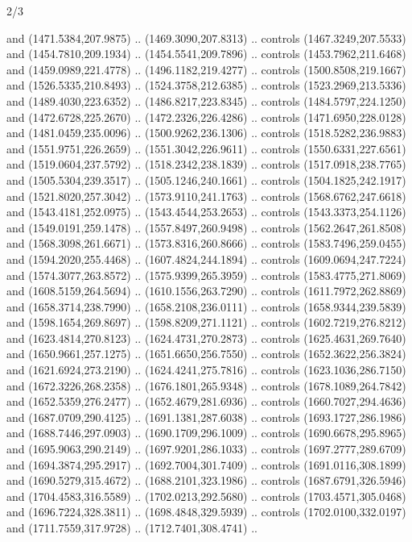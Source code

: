 \begin{flagdescription}{2/3}
\begin{scope}[shift=(c),scale=\flagwidth/391]
\begin{scope}[draw=black,fill=orange,line join=round,line cap=round,y=0.1mm, x=0.1mm,
 line width=0.001\flagwidth, yscale=-1,xscale=1,xshift=-172.5mm,yshift=-25mm]
  and (1471.5384,207.9875) .. (1469.3090,207.8313) .. controls
  (1467.3249,207.5533) and (1454.7810,209.1934) .. (1454.5541,209.7896) ..
  controls (1453.7962,211.6468) and (1459.0989,221.4778) .. (1496.1182,219.4277)
  .. controls (1500.8508,219.1667) and (1526.5335,210.8493) ..
  (1524.3758,212.6385) .. controls (1523.2969,213.5336) and (1489.4030,223.6352)
  .. (1486.8217,223.8345) .. controls (1484.5797,224.1250) and
  (1472.6728,225.2670) .. (1472.2326,226.4286) .. controls (1471.6950,228.0128)
  and (1481.0459,235.0096) .. (1500.9262,236.1306) .. controls
  (1518.5282,236.9883) and (1551.9751,226.2659) .. (1551.3042,226.9611) ..
  controls (1550.6331,227.6561) and (1519.0604,237.5792) .. (1518.2342,238.1839)
  .. controls (1517.0918,238.7765) and (1505.5304,239.3517) ..
  (1505.1246,240.1661) .. controls (1504.1825,242.1917) and (1521.8020,257.3042)
  .. (1573.9110,241.1763) .. controls (1568.6762,247.6618) and
  (1543.4181,252.0975) .. (1543.4544,253.2653) .. controls (1543.3373,254.1126)
  and (1549.0191,259.1478) .. (1557.8497,260.9498) .. controls
  (1562.2647,261.8508) and (1568.3098,261.6671) .. (1573.8316,260.8666) ..
  controls (1583.7496,259.0455) and (1594.2020,255.4468) .. (1607.4824,244.1894)
  .. controls (1609.0694,247.7224) and (1574.3077,263.8572) ..
  (1575.9399,265.3959) .. controls (1583.4775,271.8069) and (1608.5159,264.5694)
  .. (1610.1556,263.7290) .. controls (1611.7972,262.8869) and
  (1658.3714,238.7990) .. (1658.2108,236.0111) .. controls (1658.9344,239.5839)
  and (1598.1654,269.8697) .. (1598.8209,271.1121) .. controls
  (1602.7219,276.8212) and (1623.4814,270.8123) .. (1624.4731,270.2873) ..
  controls (1625.4631,269.7640) and (1650.9661,257.1275) .. (1651.6650,256.7550)
  .. controls (1652.3622,256.3824) and (1621.6924,273.2190) ..
  (1624.4241,275.7816) .. controls (1623.1036,286.7150) and (1672.3226,268.2358)
  .. (1676.1801,265.9348) .. controls (1678.1089,264.7842) and
  (1652.5359,276.2477) .. (1652.4679,281.6936) .. controls (1660.7027,294.4636)
  and (1687.0709,290.4125) .. (1691.1381,287.6038) .. controls
  (1693.1727,286.1986) and (1688.7446,297.0903) .. (1690.1709,296.1009) ..
  controls (1690.6678,295.8965) and (1695.9063,290.2149) .. (1697.9201,286.1033)
  .. controls (1697.2777,289.6709) and (1694.3874,295.2917) ..
  (1692.7004,301.7409) .. controls (1691.0116,308.1899) and (1690.5279,315.4672)
  .. (1688.2101,323.1986) .. controls (1687.6791,326.5946) and
  (1704.4583,316.5589) .. (1702.0213,292.5680) .. controls (1703.4571,305.0468)
  and (1696.7224,328.3811) .. (1698.4848,329.5939) .. controls
  (1702.0100,332.0197) and (1711.7559,317.9728) .. (1712.7401,308.4741) ..

\end{scope}
\end{scope}
\end{flagdescription}
